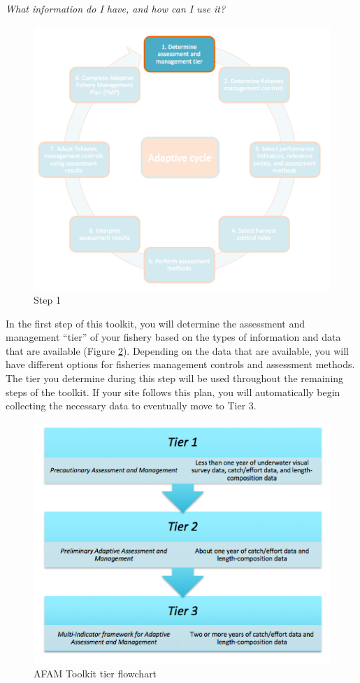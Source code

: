 \documentclass[]{book}
\begin{document}
\emph{What information do I have, and how can I use it?}

\begin{figure}
\centering
\includegraphics{myMediaFolder/media/Step1.png}
\caption{\label{fig:Step1}Step 1}
\end{figure}

In the first step of this toolkit, you will determine the assessment and
management ``tier'' of your fishery based on the types of information
and data that are available (Figure
\protect\hyperlink{fig:Tiers}{\ref{fig:Tiers}}). Depending on the data
that are available, you will have different options for fisheries
management controls and assessment methods. The tier you determine
during this step will be used throughout the remaining steps of the
toolkit. If your site follows this plan, you will automatically begin
collecting the necessary data to eventually move to Tier 3.

\begin{figure}
\centering
\includegraphics{myMediaFolder/media/Tiers.png}
\caption{\label{fig:Tiers}AFAM Toolkit tier flowchart}
\end{figure}
\end{document}
